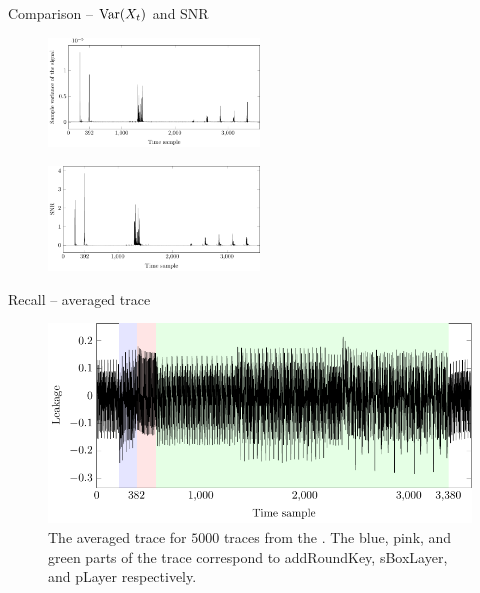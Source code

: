 \begin{frame}{Comparison -- $\textrm{Var}{\left(X_t\right)}$ and SNR}
    \begin{figure}
        \centering
        \includegraphics[width=0.5\textwidth]{fig/signal_identity_model.pdf}
    \end{figure}
    \begin{figure}
        \centering
        \includegraphics[width=0.5\textwidth]{fig/SNR_identity_model.pdf}
    \end{figure}
\end{frame}

\begin{frame}{Recall -- averaged trace}
    \begin{figure}
    \centering
\includegraphics{fig/PRESENT_plot___one_round_average___highlighted_operations.pdf}
    \caption{The averaged trace for $5000$ traces from the \datafixone.
    The blue, pink, and green parts of the trace correspond to addRoundKey, sBoxLayer, and pLayer respectively.}
\end{figure}
\end{frame}


